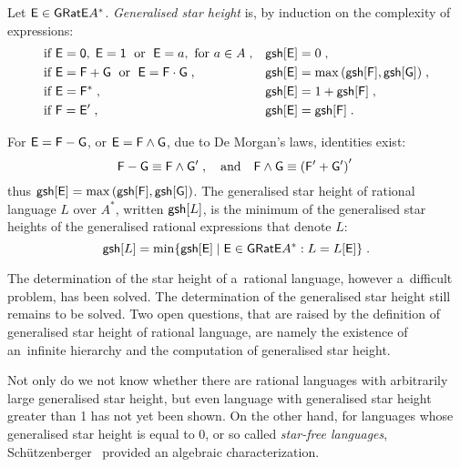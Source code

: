 \begin{defn}
    Let ${\mathsf{E}} \in {\mathsf{GRatE}} A^*$. \emph{Generalised star height} is, by induction on the complexity of expressions:
    \begin{align*}
        &\text{if } {\mathsf{E}} = {\mathsf{0}}, \; {\mathsf{E}} = {\mathsf{1}} \; \text{ or } \; {\mathsf{E}} = a, \text{ for } a \in A \; , & &{\mathsf{gs h}[{\mathsf{E}}]} = 0 \; , \\
        &\text{if } {\mathsf{E}} = {\mathsf{F}} + {\mathsf{G}} \; \text{ or } \; {\mathsf{E}} = {\mathsf{F}} \cdot {\mathsf{G}}\; , & &{\mathsf{gs h}[{\mathsf{E}}]} = \max{({\mathsf{gs h}[{\mathsf{F}}]}, {\mathsf{gs h}[{\mathsf{G}}]})} \; , \\
        &\text{if } {\mathsf{E}} = {\mathsf{F}}^* \; , & &{\mathsf{gs h}[{\mathsf{E}}]} = 1 + {\mathsf{gs h}[{\mathsf{F}}]} \; , \\
        &\text{if } {\mathsf{F}} = {\mathsf{E}}^{\prime} \; , & &{\mathsf{gs h}[{\mathsf{E}}]} = {\mathsf{gs h}[{\mathsf{F}}]} \; .
    \end{align*}
\end{defn}
For ${\mathsf{E}} = {\mathsf{F}} - {\mathsf{G}}$, or ${\mathsf{E}} = {\mathsf{F}} \wedge {\mathsf{G}}$, due to De Morgan's laws, identities exist:
\[
    {\mathsf{F}} - {\mathsf{G}} \equiv {\mathsf{F}} \wedge {\mathsf{G}}^{\prime} \; , \quad \text{and} \quad {\mathsf{F}} \wedge {\mathsf{G}} \equiv {({\mathsf{F}}^{\prime} + {\mathsf{G}}^{\prime})}^{\prime} \;
\]
thus ${\mathsf{gs h}[{\mathsf{E}}]} = \max{({\mathsf{gs h}[{\mathsf{F}}]}, {\mathsf{gs h}[{\mathsf{G}}]})}$. The generalised star height of rational language $L$ over $A^*$, written ${\mathsf{gs h}[L]}$, is the minimum of the generalised star heights of the generalised rational expressions that denote $L$:
\[
    {\mathsf{gs h}[L]} = \min \{ {\mathsf{gs h}[{\mathsf{E}}]} \mid {\mathsf{E}} \in {\mathsf{GRatE}} A^*: L = L[{\mathsf{E}}] \} \; .
\]

The determination of the star height of a~rational language, however a~difficult problem, has been solved. The determination of the generalised star height still remains to be solved. Two open questions, that are raised by the definition of generalised star height of rational language, are namely the existence of an~infinite hierarchy and the computation of generalised star height.

Not only do we not know whether there are rational languages with arbitrarily large generalised star height, but even language with generalised star height greater than 1 has not yet been shown. On the other hand, for languages whose generalised star height is equal to 0, or so called \emph{star-free languages}, Schützenberger~\cite{Schutzenberger65} provided an algebraic characterization.